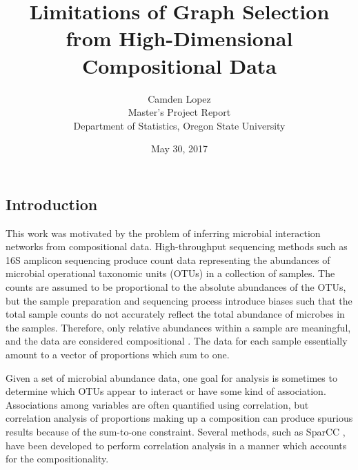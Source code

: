 \documentclass[12pt]{article}
\title{Limitations of Graph Selection from High-Dimensional Compositional Data}
\author{Camden Lopez \\ Master's Project Report \\ Department of Statistics, Oregon State University}
\date{May 30, 2017}
\begin{document}
\maketitle


\clearpage
\setcounter{page}{1}

\subsection*{Introduction}

This work was motivated by the problem of inferring microbial interaction networks from compositional data. High-throughput sequencing methods such as 16S amplicon sequencing produce count data representing the abundances of microbial operational taxonomic units (OTUs) in a collection of samples. The counts are assumed to be proportional to the absolute abundances of the OTUs, but the sample preparation and sequencing process introduce biases such that the total sample counts do not accurately reflect the total abundance of microbes in the samples. Therefore, only relative abundances within a sample are meaningful, and the data are considered compositional \cite{gloor,tsilimigras}. The data for each sample essentially amount to a vector of proportions which sum to one.

Given a set of microbial abundance data, one goal for analysis is sometimes to determine which OTUs appear to interact or have some kind of association. Associations among variables are often quantified using correlation, but correlation analysis of proportions making up a composition can produce spurious results because of the sum-to-one constraint. Several methods, such as SparCC \cite{friedmanjon}, have been developed to perform correlation analysis in a manner which accounts for the compositionality.
\end{document}
